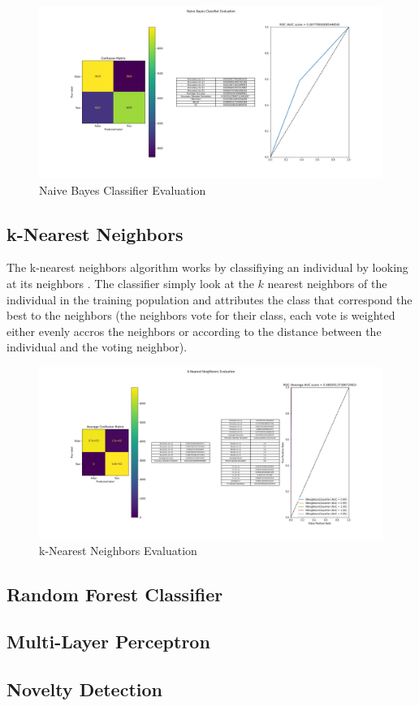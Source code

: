 \begin{figure}
    \center
    \includegraphics[scale=0.3]{img/nbc_d.png}
    \caption{Naive Bayes Classifier Evaluation}
    \label{nbc}
\end{figure}

\subsection{k-Nearest Neighbors}
The k-nearest neighbors algorithm works by classifiying an individual by looking at its neighbors \cite{knn_wikipedia}. The classifier simply look at the \(k\) nearest neighbors of the individual in the training population and attributes the class that correspond the best to the neighbors (the neighbors vote for their class, each vote is weighted either evenly accros the neighbors or according to the distance between the individual and the voting neighbor).\\

\begin{figure}
    \center
    \includegraphics[scale=0.3]{img/knn_d.png}
    \caption{k-Nearest Neighbors Evaluation}
    \label{knn}
\end{figure}

\subsection{Random Forest Classifier}

\subsection{Multi-Layer Perceptron}

\subsection{Novelty Detection}